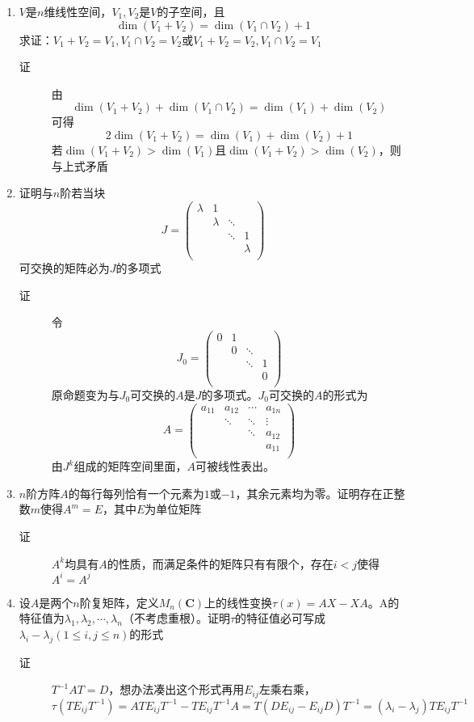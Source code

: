 \begin{enumerate}
\item $V$是$n$维线性空间，$V_1,V_2$是$V$的子空间，且
\[
\dim(V_1+V_2) = \dim(V_1\cap V_2)+1
\]
求证：$V_1+V_2=V_1,V_1\cap V_2=V_2$或$V_1+V_2=V_2,V_1\cap V_2=V_1$
\begin{description}
\item[证] 由
\[
\dim(V_1+V_2) + \dim(V_1 \cap V_2)= \dim(V_1)+\dim(V_2)
\]
可得
\[
2\dim(V_1+V_2) = \dim(V_1) + \dim(V_2) + 1
\]
若$\dim(V_1+V_2)>\dim(V_1)$且$\dim(V_1+V_2)>\dim(V_2)$，则与上式矛盾
\end{description}

\item 证明与$n$阶若当块
\[
J=\left(
\begin{array}{cccc}
\lambda & 1 & & \\
 & \lambda & \ddots & \\
 & & \ddots & 1 \\
 & & & \lambda \\
\end{array} \right)
\]
可交换的矩阵必为$J$的多项式
\begin{description}
\item[证] 令
\[
J_0=\left(
\begin{array}{cccc}
0 & 1 & & \\
 & 0 & \ddots & \\
 & & \ddots & 1 \\
 & & & 0 \\
\end{array} \right)
\]
原命题变为与$J_0$可交换的$A$是$J$的多项式。$J_0$可交换的$A$的形式为
\[
A=\left(
\begin{array}{cccc}
a_{11} & a_{12} & \cdots & a_{1n}\\
 & \ddots & \ddots & \vdots \\
 & & \ddots & a_{12} \\
 & & & a_{11} \\
\end{array} \right)
\]
由$J^k$组成的矩阵空间里面，$A$可被线性表出。
\end{description}


\item $n$阶方阵$A$的每行每列恰有一个元素为$1$或$-1$，其余元素均为零。证明存在正整数$m$使得$A^m=E$，其中$E$为单位矩阵
\begin{description}
\item[证] $A^k$均具有$A$的性质，而满足条件的矩阵只有有限个，存在$i<j$使得$A^i=A^j$
\end{description}

\item 设$A$是两个$n$阶复矩阵，定义$M_n(\mathbf{C})$上的线性变换$\tau(x)=AX-XA$。A的特征值为$\lambda_1,\lambda_2,\cdots,\lambda_n$（不考虑重根）。证明$\tau$的特征值必可写成$\lambda_i-\lambda_j(1\leq i,j \leq n)$的形式
\begin{description}
\item[证] $T^{-1}AT=D$，想办法凑出这个形式再用$E_{ij}$左乘右乘，$\tau(TE_{ij}T^{-1})=ATE_{ij}T^{-1}-TE_{ij}T^{-1}A=T(DE_{ij}-E_{ij}D)T^{-1}=(\lambda_i-\lambda_j)TE_{ij}T^{-1}$
\end{description}


\end{enumerate}
